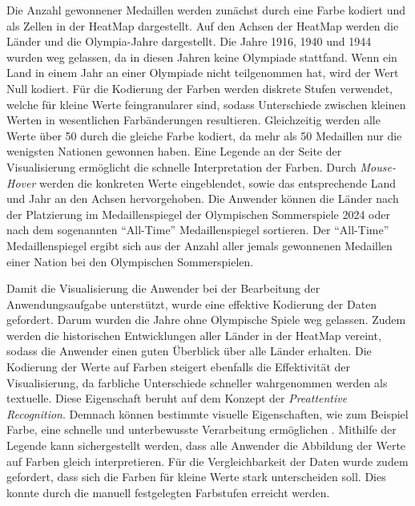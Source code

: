 Die Anzahl gewonnener Medaillen werden zunächst durch eine Farbe kodiert und als Zellen in der HeatMap dargestellt. Auf den Achsen der HeatMap werden die Länder und die Olympia-Jahre dargestellt. Die Jahre 1916, 1940 und 1944 wurden weg gelassen, da in diesen Jahren keine Olympiade stattfand. Wenn ein Land in einem Jahr an einer Olympiade nicht teilgenommen hat, wird der Wert Null kodiert. Für die Kodierung der Farben werden diskrete Stufen verwendet, welche für kleine Werte feingranularer sind, sodass Unterschiede zwischen kleinen Werten in wesentlichen Farbänderungen resultieren. Gleichzeitig werden alle Werte über 50 durch die gleiche Farbe kodiert, da mehr als 50 Medaillen nur die wenigsten Nationen gewonnen haben. Eine Legende an der Seite der Visualisierung ermöglicht die schnelle Interpretation der Farben. Durch \textit{Mouse-Hover} werden die konkreten Werte eingeblendet, sowie das entsprechende Land und Jahr an den Achsen hervorgehoben. Die Anwender können die Länder nach der Platzierung im Medaillenspiegel der Olympischen Sommerspiele 2024 oder nach dem sogenannten \enquote{All-Time} Medaillenspiegel sortieren. Der \enquote{All-Time} Medaillenspiegel ergibt sich aus der Anzahl aller jemals gewonnenen Medaillen einer Nation bei den Olympischen Sommerspielen.

Damit die Visualisierung die Anwender bei der Bearbeitung der Anwendungsaufgabe unterstützt, wurde eine effektive Kodierung der Daten gefordert. Darum wurden die Jahre ohne Olympische Spiele weg gelassen. Zudem werden die historischen Entwicklungen aller Länder in der HeatMap vereint, sodass die Anwender einen guten Überblick über alle Länder erhalten. Die Kodierung der Werte auf Farben steigert ebenfalls die Effektivität der Visualisierung, da farbliche Unterschiede schneller wahrgenommen werden als textuelle. Diese Eigenschaft beruht auf dem Konzept der \textit{Preattentive Recognition}. Demnach können bestimmte visuelle Eigenschaften, wie zum Beispiel Farbe, eine schnelle und unterbewusste Verarbeitung ermöglichen \cite{preAttent}. Mithilfe der Legende kann sichergestellt werden, dass alle Anwender die Abbildung der Werte auf Farben gleich interpretieren. Für die Vergleichbarkeit der Daten wurde zudem gefordert, dass sich die Farben für kleine Werte stark unterscheiden soll. Dies konnte durch die manuell festgelegten Farbstufen erreicht werden.

